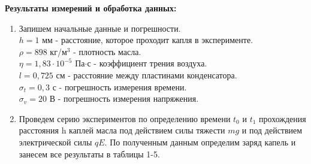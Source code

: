 \documentclass[a4paper, 12pt]{article}%
\begin{document}
	\textbf{Результаты измерений и обработка данных: }\\
	\begin{enumerate}
	\item Запишем начальные данные и погрешности.\\
	$ h = 1$ мм - расстояние, которое проходит капля в эксперименте.\\
	$ \rho = 898 $ кг/м$^3$ - плотность масла. \\
	$ \eta = 1,83 \cdot 10^{-5}$ Па$\cdot$с - коэффициент трения воздуха.\\ 
	$ l = 0,725$ см - расстояние между пластинами конденсатора.\\
	$\sigma_t = 0,3$ с - погрешность измерения времени.\\
	$ \sigma_v = 20 $ В - погрешность измерения напряжения.\\
	
	\item Проведем серию экспериментов по определению времени $t_0$ и $t_1$ прохождения расстояния h каплей масла под действием силы тяжести $mg$ и под действием электрической силы $qE$. По полученным данным определим заряд капель и занесем все результаты в таблицы 1-5.
	
	\newpage



\end{enumerate}
\end{document}
